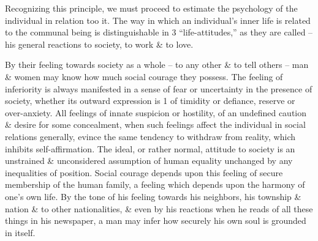 \documentclass{article}
\begin{document}
Recognizing this principle, we must proceed to estimate the psychology of the individual in relation too it. The way in which an individual's inner life is related to the communal being is distinguishable in 3 ``life-attitudes,'' as they are called -- his general reactions to society, to work \& to love.

By their feeling towards society as a whole -- to any other \& to tell others -- man \& women may know how much social courage they possess. The feeling of inferiority is always manifested in a sense of fear or uncertainty in the presence of society, whether its outward expression is 1 of timidity or defiance, reserve or over-anxiety. All feelings of innate suspicion or hostility, of an undefined caution \& desire for some concealment, when such feelings affect the individual in social relations generally, evince the same tendency to withdraw from reality, which inhibits self-affirmation. The ideal, or rather normal, attitude to society is an unstrained \& unconsidered assumption of human equality unchanged by any inequalities of position. Social courage depends upon this feeling of secure membership of the human family, a feeling which depends upon the harmony of one's own life. By the tone of his feeling towards his neighbors, his township \& nation \& to other nationalities, \& even by his reactions when he reads of all these things in his newspaper, a man may infer how securely his own soul is grounded in itself.
\end{document}
